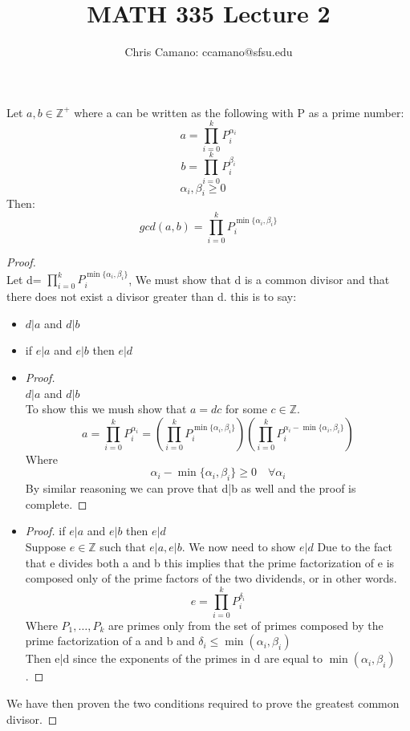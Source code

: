 \documentclass[12pt]{article}
\author{Chris Camano: ccamano@sfsu.edu}
\title{MATH 335  Lecture 2 }
\date
\newcommand{\Z}{\mathbb{Z}}
\theoremstyle{definition}
\theoremstyle{remark}
\numberwithin{equation}{section}
\begin{document}
\maketitle
\prop Let $a,b \in \Z^+$ where a can be written as the following with P as a prime number:
\[
  a=\prod_{i=0}^kP_i^{\alpha_i}
\]
\[
  b=\prod_{i=0}^kP_i^{\beta_i}
\]
\[
  \alpha_i,\beta_i \geq 0\quad
\]
Then:
\[
  gcd(a,b)=\prod_{i=0}^kP_i^{\min\{\alpha_i,\beta_i\}}
\]
\begin{proof}\\
  Let d= $\prod_{i=0}^kP_i^{\min\{\alpha_i,\beta_i\}}$, We must show that d is a common divisor and that there does not exist a divisor greater than d. this is to say:
  \begin{itemize}
    \item $d|a$ and $d|b$
    \item if $e|a$ and $e|b$ then $e|d$
  \end{itemize}
  \begin{itemize}
    \item \begin{proof}\\
      $d|a$ and $d|b$\\
      To show this we mush show that $a=dc$ for some $c \in \Z$. \\
      \[
        a=\prod_{i=0}^kP_i^{\alpha_i}=\left(\prod_{i=0}^kP_i^{\min\{\alpha_i,\beta_i\}}\right)\left(\prod_{i=0}^kP_i^{\alpha_i-\min\{\alpha_i,\beta_i\}}\right)
      \]
      Where $$\alpha_i-\min\{\alpha_i,\beta_i\} \geq 0 \quad \forall \alpha_i$$
      By similar reasoning we can prove that d|b as well and the proof is complete.
      \end{proof}
      \item \begin{proof}
        if $e|a$ and $e|b$ then $e|d$\\
        Suppose $e\in \Z$ such that $e|a,e|b$. We now need to show $e|d$ Due to the fact that e divides both a and b this implies that the prime factorization of e is composed only of the prime factors of the two dividends, or in other words.
        \[
          e=\prod_{i=0}^k P_i^{\delta_i}
        \]
        Where $P_1,\ldots,P_k$ are primes only from the set of primes composed by the prime factorization of a and b and $\delta_i \leq \min (\alpha_i,\beta_i)$\\
        Then e|d since the exponents of the primes in d are equal to $\min (\alpha_i,\beta_i)$.
  \end{proof}
  \end{itemize}
  We have then proven the two conditions required to prove the greatest common divisor.
\end{proof}
\end{document}
